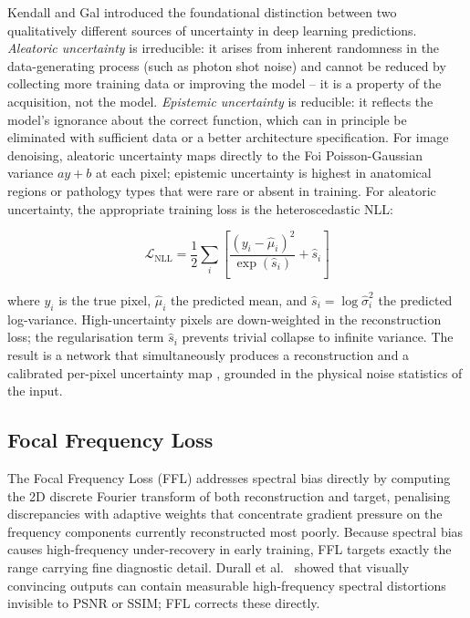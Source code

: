 \documentclass[12pt, a4paper, twoside, openright]{book}
\begin{document}
Kendall and Gal \cite{kendall_what_2017} introduced the foundational distinction between two qualitatively different sources of uncertainty in deep learning predictions. \emph{Aleatoric uncertainty} is irreducible: it arises from inherent randomness in the data-generating process (such as photon shot noise) and cannot be reduced by collecting more training data or improving the model -- it is a property of the acquisition, not the model. \emph{Epistemic uncertainty} is reducible: it reflects the model's ignorance about the correct function, which can in principle be eliminated with sufficient data or a better architecture specification. For image denoising, aleatoric uncertainty maps directly to the Foi Poisson-Gaussian variance $ay+b$ at each pixel; epistemic uncertainty is highest in anatomical regions or pathology types that were rare or absent in training. For aleatoric uncertainty, the appropriate training loss is the heteroscedastic NLL:

\begin{equation}
\label{eq:lit:nll}
\mathcal{L}_\mathrm{NLL} = \frac{1}{2} \sum_i \left[
  \frac{(y_i - \hat{\mu}_i)^2}{\exp(\hat{s}_i)} + \hat{s}_i
\right]
\end{equation}

where $y_i$ is the true pixel, $\hat{\mu}_i$ the predicted mean, and $\hat{s}_i = \log\hat{\sigma}^2_i$ the predicted log-variance. High-uncertainty pixels are down-weighted in the reconstruction loss; the regularisation term $\hat{s}_i$ prevents trivial collapse to infinite variance. The result is a network that simultaneously produces a reconstruction and a calibrated per-pixel uncertainty map \cite{kendall_what_2017}, grounded in the physical noise statistics of the input.

\subsection{Focal Frequency Loss}
\label{sec:lit:losses:ffl}

The Focal Frequency Loss (FFL) \cite{jiang_focal_2021} addresses spectral bias directly by computing the 2D discrete Fourier transform of both reconstruction and target, penalising discrepancies with adaptive weights that concentrate gradient pressure on the frequency components currently reconstructed most poorly. Because spectral bias causes high-frequency under-recovery in early training, FFL targets exactly the range carrying fine diagnostic detail. Durall et al.\ \cite{durall_watch_2020} showed that visually convincing outputs can contain measurable high-frequency spectral distortions invisible to PSNR or SSIM; FFL corrects these directly.
\end{document}
